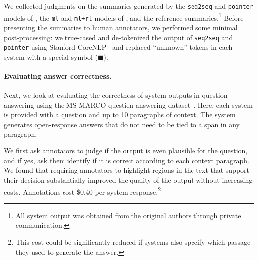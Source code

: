 We collected judgments on the summaries generated by the \texttt{seq2seq} and \texttt{pointer} models of \citet{see2017point}, the \texttt{ml} and \texttt{ml+rl} models of \citet{paulus2018deep}, and the reference summaries.\footnote{%
All system output was obtained from the original authors through private communication.} 
Before presenting the summaries to human annotators, we performed some minimal post-processing: we true-cased and de-tokenized the output of \texttt{seq2seq} and \texttt{pointer} using Stanford CoreNLP~\citep{manning2014stanford} and replaced ``unknown'' tokens in each system with a special symbol ($\blacksquare$).


\paragraph{Evaluating answer correctness.}
Next, we look at evaluating the correctness of system outputs in question answering using the MS MARCO question answering dataset~\citep{nguyen2016ms}.
Here, each system is provided with a question and up to 10 paragraphs of context.
The system generates open-response answers that do not need to be tied to a span in any paragraph.

We first ask annotators to judge if the output is even plausible for the question,
and if yes,
ask them identify if it is correct according to each context paragraph. 
We found that requiring annotators to highlight regions in the text that support their decision
substantially improved the quality of the output without increasing costs.
Annotations cost \$0.40 per system response.\footnote{%
  This cost could be significantly reduced if systems also specify which passage they used to generate the answer.
}


